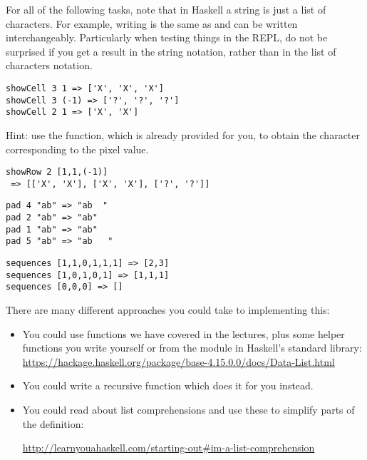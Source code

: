 For all of the following tasks, note that in Haskell a string is just a list of characters. For example, writing  is the same as \haskellIn{['a', 't']} and can be written interchangeably. Particularly when testing things in the REPL, do not be surprised if you get a result in the string notation, rather than in the list of characters notation.

\begin{verbatim}
showCell 3 1 => ['X', 'X', 'X']
showCell 3 (-1) => ['?', '?', '?']
showCell 2 1 => ['X', 'X']
\end{verbatim}
Hint: use the  function, which is already provided for you, to obtain the character corresponding to the pixel value. 

\begin{verbatim}
showRow 2 [1,1,(-1)]
 => [['X', 'X'], ['X', 'X'], ['?', '?']]
\end{verbatim}

\begin{verbatim}
pad 4 "ab" => "ab  "
pad 2 "ab" => "ab"
pad 1 "ab" => "ab"
pad 5 "ab" => "ab   "
\end{verbatim}

\taskLine

\begin{verbatim}
sequences [1,1,0,1,1,1] => [2,3]
sequences [1,0,1,0,1] => [1,1,1]
sequences [0,0,0] => []
\end{verbatim}
There are many different approaches you could take to implementing this: 
\begin{itemize}
    \item You could use functions we have covered in the lectures, plus some helper functions you write yourself or from the  module in Haskell's standard library: \url{https://hackage.haskell.org/package/base-4.15.0.0/docs/Data-List.html}
    \item You could write a recursive function which does it for you instead.
    \item You could read about list comprehensions and use these to simplify parts of the definition: 
    
    {\small \url{http://learnyouahaskell.com/starting-out#im-a-list-comprehension}}
\end{itemize}

